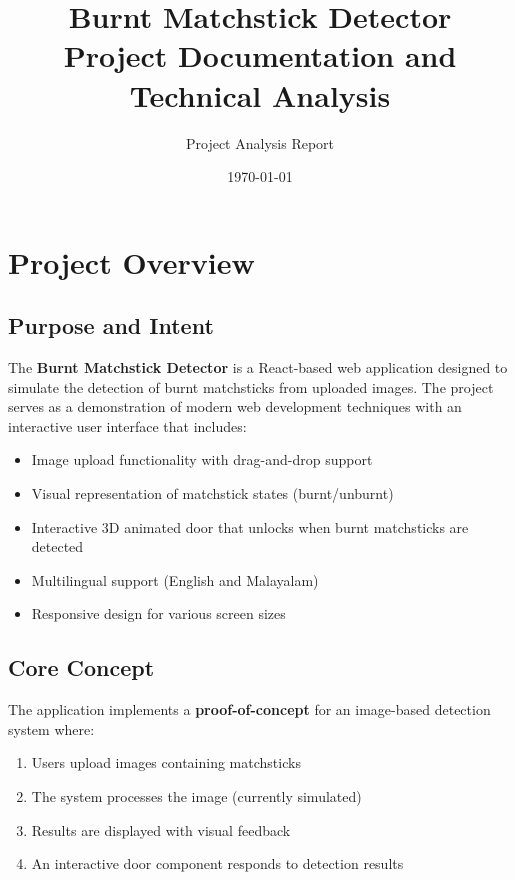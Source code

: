 \documentclass[12pt,a4paper]{article}
\begin{document}
\title{\Huge\textbf{Burnt Matchstick Detector}\\[0.5cm]
\Large Project Documentation and Technical Analysis}
\author{Project Analysis Report}
\date{\today}

\maketitle

\tableofcontents
\newpage

\section{Project Overview}

\subsection{Purpose and Intent}
The \textbf{Burnt Matchstick Detector} is a React-based web application designed to simulate the detection of burnt matchsticks from uploaded images. The project serves as a demonstration of modern web development techniques with an interactive user interface that includes:

\begin{itemize}
    \item Image upload functionality with drag-and-drop support
    \item Visual representation of matchstick states (burnt/unburnt)
    \item Interactive 3D animated door that unlocks when burnt matchsticks are detected
    \item Multilingual support (English and Malayalam)
    \item Responsive design for various screen sizes
\end{itemize}

\subsection{Core Concept}
The application implements a \textbf{proof-of-concept} for an image-based detection system where:
\begin{enumerate}
    \item Users upload images containing matchsticks
    \item The system processes the image (currently simulated)
    \item Results are displayed with visual feedback
    \item An interactive door component responds to detection results
\end{enumerate}
\end{document}
